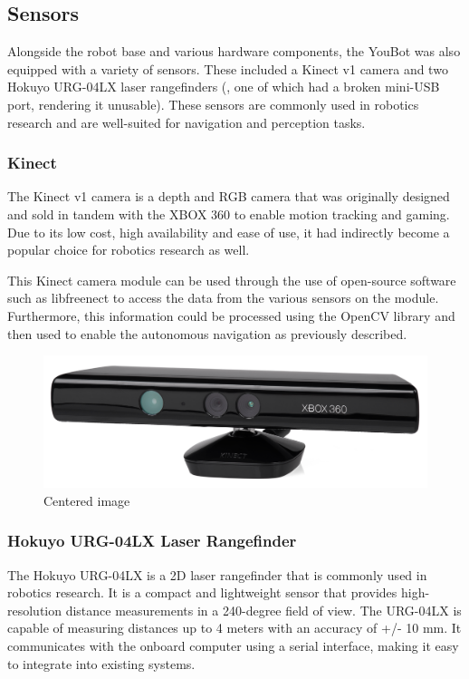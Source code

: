 \documentclass[a4paper, 12pt]{article}
\newif\ifshownotes
\newcommand{\notes}[1]{\ifshownotes\textcolor{blue}{#1}\fi}
\begin{document}
    \subsection{Sensors}
    
    Alongside the robot base and various hardware components, the YouBot was also equipped with a variety of sensors. These included a Kinect v1 camera and two Hokuyo URG-04LX laser rangefinders (, one of which had a broken mini-USB port, rendering it unusable). These sensors are commonly used in robotics research and are well-suited for navigation and perception tasks.

    \subsubsection{Kinect}  

    The Kinect v1 camera is a depth and RGB camera that was originally designed and sold in tandem with the XBOX 360 to enable motion tracking and gaming. Due to its low cost, high availability and ease of use, it had indirectly become a popular choice for robotics research as well.

    This Kinect camera module can be used through the use of open-source software such as libfreenect \notes{[cite]} to access the data from the various sensors on the module. Furthermore, this information could be processed using the OpenCV library and then used to enable the autonomous navigation as previously described. 

    \begin{figure}[ht]
        \centering
        \includegraphics[width=0.5\linewidth]{images/sec2/kinectv1.png}
        \caption{Centered image}
    \end{figure}


    \subsubsection{Hokuyo URG-04LX Laser Rangefinder}

    The Hokuyo URG-04LX is a 2D laser rangefinder that is commonly used in robotics research. It is a compact and lightweight sensor that provides high-resolution distance measurements in a 240-degree field of view. The URG-04LX is capable of measuring distances up to 4 meters with an accuracy of +/- 10 mm. It communicates with the onboard computer using a serial interface, making it easy to integrate into existing systems. 
\end{document}
